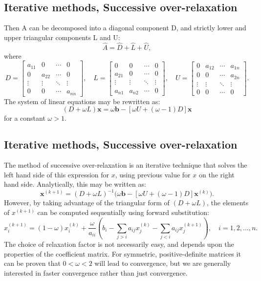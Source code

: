 \documentclass[%
twoside,                 %
final,                   %
10pt]{article}
\begin{document}
{{{{{{{\subsection{Iterative methods, Successive over-relaxation}
\begin{block}{}
Then A can be decomposed into a diagonal component D, and strictly lower and upper triangular components L and U:
\[
    \hat{A} =\hat{D} + \hat{L} + \hat{U},
\]
where
\[
    D = \begin{bmatrix} a_{11} & 0 & \cdots & 0 \\ 0 & a_{22} & \cdots & 0 \\ \vdots & \vdots & \ddots & \vdots \\0 & 0 & \cdots & a_{nn} \end{bmatrix}, \quad L = \begin{bmatrix} 0 & 0 & \cdots & 0 \\ a_{21} & 0 & \cdots & 0 \\ \vdots & \vdots & \ddots & \vdots \\a_{n1} & a_{n2} & \cdots & 0 \end{bmatrix}, \quad U = \begin{bmatrix} 0 & a_{12} & \cdots & a_{1n} \\ 0 & 0 & \cdots & a_{2n} \\ \vdots & \vdots & \ddots & \vdots \\0 & 0 & \cdots & 0 \end{bmatrix}. 
\]
The system of linear equations may be rewritten as:
\[
    (D+\omega L) \mathbf{x} = \omega \mathbf{b} - [\omega U + (\omega-1) D ] \mathbf{x} 
\]
for a constant $\omega > 1$.
\end{block}


\subsection{Iterative methods, Successive over-relaxation}
\begin{block}{}
The method of successive over-relaxation is an iterative technique that solves the left hand side of this expression for $x$, using previous value for $x$ on the right hand side. Analytically, this may be written as:
\[
    \mathbf{x}^{(k+1)} = (D+\omega L)^{-1} \big(\omega \mathbf{b} - [\omega U + (\omega-1) D ] \mathbf{x}^{(k)}\big). 
\]
However, by taking advantage of the triangular form of $(D+\omega L)$, the elements of $x^{(k+1)}$ can be computed sequentially using forward substitution:
\[
    x^{(k+1)}_i = (1-\omega)x^{(k)}_i + \frac{\omega}{a_{ii}} \left(b_i - \sum_{j > i} a_{ij}x^{(k)}_j - \sum_{j < i} a_{ij}x^{(k+1)}_j \right),\quad i=1,2,\ldots,n. 
\]
The choice of relaxation factor is not necessarily easy, and depends upon the properties of the coefficient matrix. For symmetric, positive-definite matrices it can be proven that $0 < \omega < 2$ will lead to convergence, but we are generally interested in faster convergence rather than just convergence.
\end{block}



}}}}}}}
\end{document}
